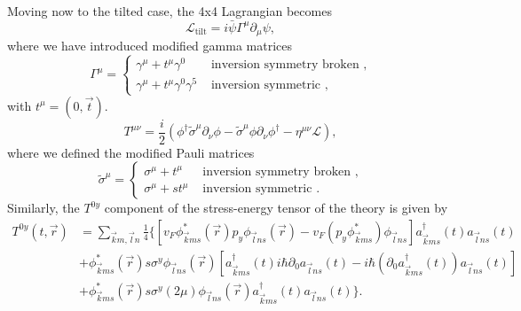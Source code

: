 Moving now to the tilted case, the 4x4 Lagrangian becomes \cite{vanderwurffMagnetovorticalThermoelectricTransport2019}
\begin{equation}
  \label{eq:71}
  \mathcal{L}_{\text{tilt}} = i \bar{\psi} \Gamma ^{\mu }\partial_{\mu } \psi ,
\end{equation}
where we have introduced modified gamma matrices
\begin{equation}
  \label{eq:72}
  \Gamma ^{\mu } =
  \begin{cases}
    \gamma ^{\mu } + t^{\mu} \gamma ^0& \text{ inversion symmetry broken },\\
    \gamma^{\mu} + t^{\mu} \gamma^0 \gamma^5 & \text{ inversion symmetric },
  \end{cases}
\end{equation}
with \( t^{\mu } = (0, \vec{t}) \).
\begin{equation}
  \label{eq:73}
  T^{\mu \nu} =
  \frac{i}{2} (
  \phi^{\dagger} \tilde{\sigma} ^{\mu} \partial_{\nu} \phi
  - \tilde{\sigma} ^{\mu} \phi \partial_{\nu} \phi^{\dagger}
  - \eta^{\mu \nu} \mathcal{L}
  ),
\end{equation}
where we defined the modified Pauli matrices
\begin{equation}
  \label{eq:74}
  \tilde{\sigma}^{\mu} =
  \begin{cases}
    \sigma^{\mu} + t^{\mu} & \text{ inversion symmetry broken },\\
    \sigma^{\mu} + s t^{\mu} & \text{ inversion symmetric }.
  \end{cases}
\end{equation}
Similarly, the $T^{0y}$ component of the stress-energy tensor of the theory is given by~\cite{arjonaFingerprintsConformalAnomaly2019}
\begin{equation}
  \begin{split}
    T^{0y}(t, \vec{r}) &=
    \sum\limits_{\vec{k} m, \vec{l} n}^{}
    \frac{1}{4}
    \bigg\{
    \left[
      v_F \phi ^{*}_{\vec{k} m s}(\vec{r}) p_y \phi _{\vec{l} n s}(\vec{r})
      -v_F \left( p_y \phi ^{*}_{\vec{k} m s} \right) \phi _{\vec{l} ns}
    \right] a^{\dagger}_{\vec{k} m s}(t) a_{\vec{l} n s}(t)\\
    &+ \phi ^{*}_{\vec{k} m s}(\vec{r}) s \sigma ^y \phi _{\vec{l} n s }(\vec{r})
    \left[
      a^{\dagger}_{\vec{k} m s}(t) i\hbar \partial _0  a_{\vec{l} n s}(t)
      -
      i\hbar \left(\partial _0 a^{\dagger}_{\vec{k} ms }(t) \right) a_{\vec{l} n s}(t)
    \right]\\
    &+ \phi ^{*}_{\vec{k} m s}(\vec{r}) s \sigma ^y (2\mu ) \phi _{\vec{l} n s}(\vec{r}) a^{\dagger}_{\vec{k} m s}(t) a_{\vec{l} n s}(t)
    \bigg\}.
  \end{split}
\end{equation}
